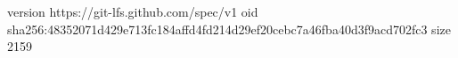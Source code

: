 version https://git-lfs.github.com/spec/v1
oid sha256:48352071d429e713fc184affd4fd214d29ef20cebc7a46fba40d3f9acd702fc3
size 2159
